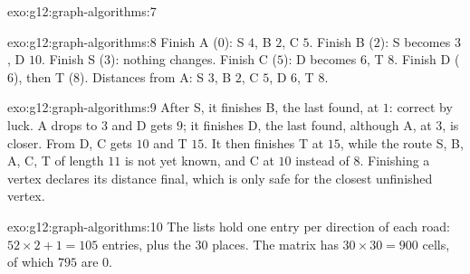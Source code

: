 \begin{solution}{exo:g12:graph-algorithms:7}
\smallskip\noindent\hspace*{2em}

\noindent\hspace*{4em}

\noindent\hspace*{4em}

\noindent\hspace*{6em}

\noindent\hspace*{6em}

\noindent\hspace*{8em}

\noindent\hspace*{6em}

\noindent\hspace*{8em}

\noindent\hspace*{10em}

\noindent\hspace*{10em}

\noindent\hspace*{4em}
\end{solution}

\begin{solution}{exo:g12:graph-algorithms:8}
Finish A ($0$): S $4$, B $2$, C $5$. Finish B ($2$): S becomes $3$, D $10$. Finish S ($3$): nothing changes. Finish C
($5$): D becomes $6$, T $8$. Finish D ($6$), then T ($8$). Distances from A: S $3$, B $2$, C $5$, D $6$, T $8$.
\end{solution}

\begin{solution}{exo:g12:graph-algorithms:9}
After S, it finishes B, the last found, at $1$: correct by luck. A drops to $3$ and D gets $9$; it finishes D, the
last found, although A, at $3$, is closer. From D, C gets $10$ and T $15$. It then finishes T at $15$, while the route
S, B, A, C, T of length $11$ is not yet known, and C at $10$ instead of $8$. Finishing a vertex declares its distance
final, which is only safe for the closest unfinished vertex.
\end{solution}

\begin{solution}{exo:g12:graph-algorithms:10}
The lists hold one entry per direction of each road: $52 \times 2 + 1 = 105$ entries, plus the $30$ places. The matrix
has $30 \times 30 = 900$ cells, of which $795$ are $0$.
\end{solution}

